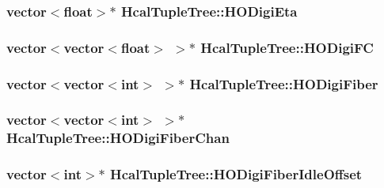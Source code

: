 \subsubsection[{H\+O\+Digi\+Eta}]{\setlength{\rightskip}{0pt plus 5cm}vector$<$float$>$$\ast$ Hcal\+Tuple\+Tree\+::\+H\+O\+Digi\+Eta}\label{class_hcal_tuple_tree_af4c462a15fc5e42100dc88e4eaa16f1e}
\hypertarget{class_hcal_tuple_tree_a285842d23b6b8d21ebed868753ee1e68}{}
\subsubsection[{H\+O\+Digi\+F\+C}]{\setlength{\rightskip}{0pt plus 5cm}vector$<$vector$<$float$>$ $>$$\ast$ Hcal\+Tuple\+Tree\+::\+H\+O\+Digi\+F\+C}\label{class_hcal_tuple_tree_a285842d23b6b8d21ebed868753ee1e68}
\hypertarget{class_hcal_tuple_tree_af0fe6322bab84267ca6092eef461829f}{}
\subsubsection[{H\+O\+Digi\+Fiber}]{\setlength{\rightskip}{0pt plus 5cm}vector$<$vector$<$int$>$ $>$$\ast$ Hcal\+Tuple\+Tree\+::\+H\+O\+Digi\+Fiber}\label{class_hcal_tuple_tree_af0fe6322bab84267ca6092eef461829f}
\hypertarget{class_hcal_tuple_tree_a558b32faee67ce93024ef6b65d39eea8}{}
\subsubsection[{H\+O\+Digi\+Fiber\+Chan}]{\setlength{\rightskip}{0pt plus 5cm}vector$<$vector$<$int$>$ $>$$\ast$ Hcal\+Tuple\+Tree\+::\+H\+O\+Digi\+Fiber\+Chan}\label{class_hcal_tuple_tree_a558b32faee67ce93024ef6b65d39eea8}
\hypertarget{class_hcal_tuple_tree_aaff952a6b231321e8ff459a7be299b89}{}
\subsubsection[{H\+O\+Digi\+Fiber\+Idle\+Offset}]{\setlength{\rightskip}{0pt plus 5cm}vector$<$int$>$$\ast$ Hcal\+Tuple\+Tree\+::\+H\+O\+Digi\+Fiber\+Idle\+Offset}\label{class_hcal_tuple_tree_aaff952a6b231321e8ff459a7be299b89}
\hypertarget{class_hcal_tuple_tree_ab3d383dc83018d2bc4e468a40af05787}{}
